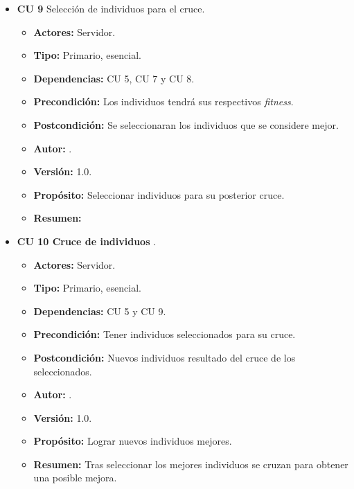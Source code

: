 \begin{itemize}
	\item \textbf{CU 9} Selección de individuos para el cruce.
	\begin{itemize}
		\item \textbf{Actores:} Servidor.
		\item \textbf{Tipo:} Primario, esencial.
		\item \textbf{Dependencias:} CU 5, CU 7 y CU 8.
		\item \textbf{Precondición:} Los individuos tendrá sus respectivos \textit{fitness}.
		\item \textbf{Postcondición:} Se seleccionaran los individuos que se considere mejor.
		\item\textbf{ Autor:} {\autor}.
		\item \textbf{Versión:} 1.0.
		\item \textbf{Propósito:} Seleccionar individuos para su posterior cruce.
		\item \textbf{Resumen:} 
	\end{itemize}	

	\item \textbf{CU 10 Cruce de individuos} .
	\begin{itemize}
		\item \textbf{Actores:} Servidor.
		\item \textbf{Tipo:} Primario, esencial.
		\item \textbf{Dependencias:} CU 5 y CU 9.
		\item \textbf{Precondición:} Tener individuos seleccionados para su cruce.
		\item \textbf{Postcondición:} Nuevos individuos resultado del cruce de los seleccionados.
		\item\textbf{ Autor:} {\autor}.
		\item \textbf{Versión:} 1.0.
		\item \textbf{Propósito:} Lograr nuevos individuos mejores.
		\item \textbf{Resumen:} Tras seleccionar los mejores individuos se cruzan para obtener una posible mejora.
	\end{itemize}	


\end{itemize}
